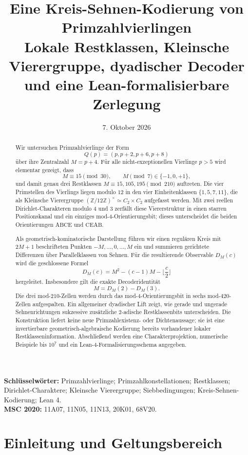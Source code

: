 \documentclass[11pt,a4paper]{article}
\title{\textbf{Eine Kreis-Sehnen-Kodierung von Primzahlvierlingen}\\
\large Lokale Restklassen, Kleinsche Vierergruppe, dyadischer Decoder und eine Lean-formalisierbare Zerlegung}
\author{}
\date{7. Oktober 2026}
\theoremstyle{definition}
\theoremstyle{remark}
\newcommand{\Z}{\mathbb Z}
\newcommand{\ABCE}{\mathrm{ABCE}}
\newcommand{\CEAB}{\mathrm{CEAB}}
\begin{document}
\maketitle

\begin{abstract}
Wir untersuchen Primzahlvierlinge der Form
\[
Q(p)=(p,p+2,p+6,p+8)
\]
über ihre Zentralzahl $M=p+4$. Für alle nicht-exzeptionellen Vierlinge $p>5$ wird elementar gezeigt, dass
\[
M\equiv 15\pmod{30},\qquad M\pmod 7\in\{-1,0,+1\},
\]
und damit genau drei Restklassen $M\equiv15,105,195\pmod{210}$ auftreten. Die vier Primstellen des Vierlings liegen modulo $12$ in den vier Einheitenklassen $\{1,5,7,11\}$, die als Kleinsche Vierergruppe $(\Z/12\Z)^\times\simeq C_2\times C_2$ aufgefasst werden. Mit zwei reellen Dirichlet-Charakteren modulo $4$ und $3$ zerfällt diese Viererstruktur in einen starren Positionskanal und ein einziges mod-$4$-Orientierungsbit; dieses unterscheidet die beiden Orientierungen $\ABCE$ und $\CEAB$.

Als geometrisch-kominatorische Darstellung führen wir einen regulären Kreis mit $2M+1$ beschrifteten Punkten $-M,\ldots,0,\ldots,M$ ein und summieren gerichtete Differenzen über Parallelklassen von Sehnen. Für die resultierende Observable $D_M(c)$ wird die geschlossene Formel
\[
D_M(c)=M^2-(c-1)M-\Big\lfloor\frac c2\Big\rfloor
\]
hergeleitet. Insbesondere gilt die exakte Decoderidentität
\[
M=D_M(2)-D_M(3).
\]
Die drei mod-$210$-Zellen werden durch das mod-$4$-Orientierungsbit in sechs mod-$420$-Zellen aufgespalten. Ein allgemeiner dyadischer Lift zeigt, wie gerade und ungerade Sehnenrichtungen sukzessive zusätzliche $2$-adische Restklassenbits unterscheiden. Die Konstruktion liefert keine neue Primzahlexistenz- oder Dichtenaussage; sie ist eine invertierbare geometrisch-algebraische Kodierung bereits vorhandener lokaler Restklasseninformation. Abschließend werden eine Charakterprojektion, numerische Beispiele bis $10^7$ und ein Lean-4-Formalisierungsschema angegeben.
\end{abstract}

\medskip
\noindent\textbf{Schlüsselwörter:} Primzahlvierlinge; Primzahlkonstellationen; Restklassen; Dirichlet-Charaktere; Kleinsche Vierergruppe; Siebbedingungen; Kreis-Sehnen-Kodierung; Lean 4.\\
\textbf{MSC 2020:} 11A07, 11N05, 11N13, 20K01, 68V20.

\tableofcontents

\section{Einleitung und Geltungsbereich}
\end{document}
